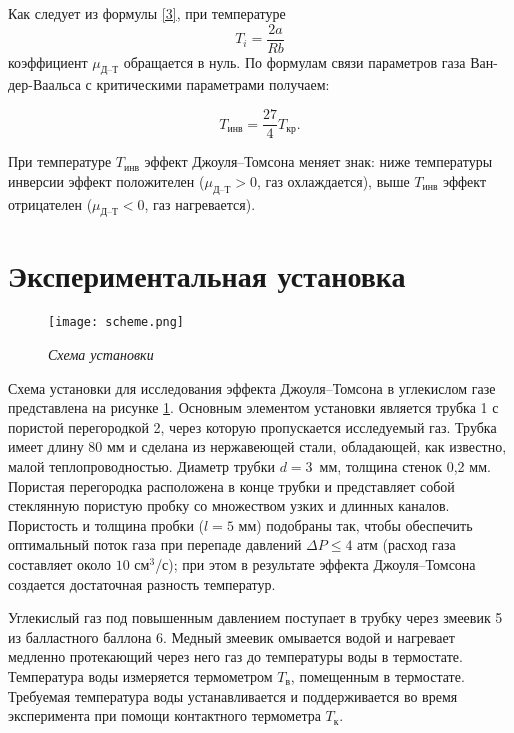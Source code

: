 \documentclass[12pt,a4paper]{article}
\begin{document}
Как следует из формулы \eqref{3}, при температуре \[ T_i = \frac{2a}{Rb} \] коэффициент $ \mu_\text{Д--Т} $ обращается в нуль. По формулам связи параметров газа Ван-дер-Ваальса с критическими параметрами получаем: 

\begin{equation}\label{4}
	T_\text{инв} = \frac{27}{4} T_\text{кр}.
\end{equation}

При температуре $ T_\text{инв} $ эффект Джоуля–Томсона меняет знак: ниже температуры инверсии эффект положителен ($ \mu_\text{Д--Т} > 0 $, газ охлаждается), выше $ T_\text{инв} $ эффект отрицателен ($ \mu_\text{Д--Т} < 0 $, газ нагревается).


\section*{Экспериментальная установка}

\begin{figure}[H]\label{ust}
	\begin{center}
		\texttt{[image: scheme.png]}
	\end{center}
	\caption{\textit{Схема установки}}
	\label{scheme}
\end{figure}

Схема установки для исследования эффекта Джоуля–Томсона в углекислом газе представлена на рисунке \ref{scheme}. Основным элементом установки является трубка 1 с пористой перегородкой 2, через которую пропускается исследуемый газ. Трубка имеет длину 80 мм и сделана из нержавеющей стали, обладающей, как известно, малой теплопроводностью. Диаметр трубки $ d = 3 $~мм, толщина стенок 0,2 мм. Пористая перегородка расположена в конце трубки и представляет собой стеклянную пористую пробку со множеством узких и длинных каналов. Пористость и толщина пробки ($ l = 5 $ мм) подобраны так, чтобы обеспечить оптимальный поток газа при перепаде давлений $ \Delta P \leqslant 4 $ атм (расход газа составляет около $ 10 $ см$ ^3 $/с); при этом в результате эффекта Джоуля–Томсона создается достаточная разность температур.

Углекислый газ под повышенным давлением поступает в трубку через змеевик 5 из балластного баллона 6. Медный змеевик омывается водой и нагревает медленно протекающий через него газ до температуры воды в термостате. Температура воды измеряется термометром $ T_\text{в} $, помещенным в термостате. Требуемая температура воды устанавливается и поддерживается во время эксперимента при помощи контактного термометра $ T_\text{к} $.
\end{document}

